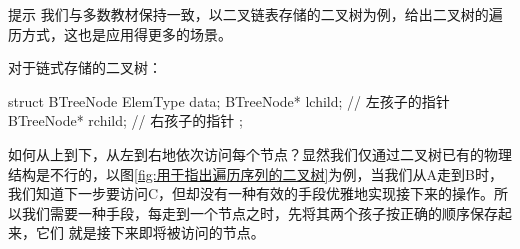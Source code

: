 \begin{notebox}{提示}
    我们与多数教材保持一致，以二叉链表存储的二叉树为例，给出二叉树的遍历方式，这也是应用得更多的场景。
\end{notebox}

对于链式存储的二叉树：
\begin{cppcode}
    struct BTreeNode {
        ElemType data;
        BTreeNode* lchild;  // 左孩子的指针
        BTreeNode* rchild;  // 右孩子的指针 
    };
\end{cppcode}
如何从上到下，从左到右地依次访问每个节点？显然我们仅通过二叉树已有的物理结构是不行的，以图\ref{fig:用于指出遍历序列的二叉树}为例，当我们从A走到B时，
我们知道下一步要访问C，但却没有一种有效的手段优雅地实现接下来的操作。所以我们需要一种手段，每走到一个节点之时，先将其两个孩子按正确的顺序保存起来，它们
就是接下来即将被访问的节点。

